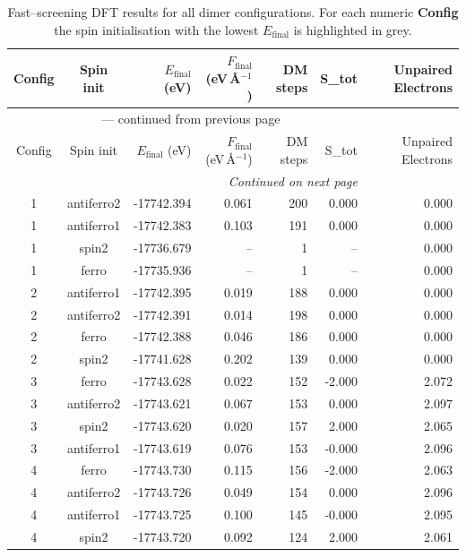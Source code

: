 
\begin{longtable}{@{}ccrrrrr@{}}
\caption{Fast–screening DFT results for all dimer configurations.
         For each numeric \textbf{Config} the spin initialisation with the
         lowest $E_{\mathrm{final}}$ is highlighted in grey.}\label{tab:dimer_full}\\
\toprule
Config & Spin init & $E_{\mathrm{final}}$ (eV) &
$F_{\mathrm{final}}$ (eV\,\AA$^{-1}$) & DM steps & S_{tot} & Unpaired Electrons\\
\midrule
\endfirsthead
\multicolumn{6}{c}{{\tablename}~\thetable{} — continued from previous page}\\
\toprule
Config & Spin init & $E_{\mathrm{final}}$ (eV) &
$F_{\mathrm{final}}$ (eV\,\AA$^{-1}$) & DM steps & S_{tot} & Unpaired Electrons\\
\midrule
\endhead
\midrule
\multicolumn{6}{r}{\emph{Continued on next page}}\\
\endfoot
\bottomrule
\endlastfoot
\rowcolor{gray!20} 1 & antiferro2 & -17742.394 & 0.061 & 200 & 0.000 & 0.000 \\
1 & antiferro1 & -17742.383 & 0.103 & 191 & 0.000 & 0.000 \\
1 & spin2 & -17736.679 & -- & 1 & -- & 0.000 \\
1 & ferro & -17735.936 & -- & 1 & -- & 0.000 \\
\rowcolor{gray!20} 2 & antiferro1 & -17742.395 & 0.019 & 188 & 0.000 & 0.000 \\
2 & antiferro2 & -17742.391 & 0.014 & 198 & 0.000 & 0.000 \\
2 & ferro & -17742.388 & 0.046 & 186 & 0.000 & 0.000 \\
2 & spin2 & -17741.628 & 0.202 & 139 & 0.000 & 0.000 \\
\rowcolor{gray!20} 3 & ferro & -17743.628 & 0.022 & 152 & -2.000 & 2.072 \\
3 & antiferro2 & -17743.621 & 0.067 & 153 & 0.000 & 2.097 \\
3 & spin2 & -17743.620 & 0.020 & 157 & 2.000 & 2.065 \\
3 & antiferro1 & -17743.619 & 0.076 & 153 & -0.000 & 2.096 \\
\rowcolor{gray!20} 4 & ferro & -17743.730 & 0.115 & 156 & -2.000 & 2.063 \\
4 & antiferro2 & -17743.726 & 0.049 & 154 & 0.000 & 2.096 \\
4 & antiferro1 & -17743.725 & 0.100 & 145 & -0.000 & 2.095 \\
4 & spin2 & -17743.720 & 0.092 & 124 & 2.000 & 2.061 \\

\end{longtable}
